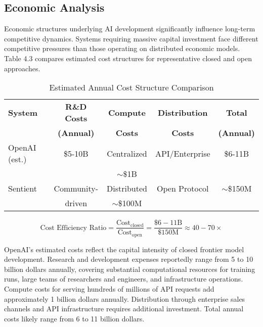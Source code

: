 \subsection{Economic Analysis}

Economic structures underlying AI development significantly influence long-term competitive dynamics. Systems requiring massive capital investment face different competitive pressures than those operating on distributed economic models. Table 4.3 compares estimated cost structures for representative closed and open approaches.

\begin{table}[h]
\centering
\caption{Estimated Annual Cost Structure Comparison}
\begin{tabular}{lcccc}
\toprule
\textbf{System} & \textbf{R\&D Costs} & \textbf{Compute} & \textbf{Distribution} & \textbf{Total} \\
                & \textbf{(Annual)}   & \textbf{Costs}   & \textbf{Costs}        & \textbf{(Annual)} \\
\midrule
OpenAI (est.)   & \$5-10B  & Centralized & API/Enterprise & \$6-11B \\
                &          & $\sim$\$1B  &                &         \\
Sentient        & Community- & Distributed & Open Protocol & $\sim$\$150M \\
                & driven   & $\sim$\$100M &               &         \\
\bottomrule
\end{tabular}
\label{tab:cost_comparison}
\end{table}

\begin{equation}
\text{Cost Efficiency Ratio} = \frac{\text{Cost}_{\text{closed}}}{\text{Cost}_{\text{open}}} = \frac{\$6{-}11\text{B}}{\$150\text{M}} \approx 40{-}70\times
\label{eq:cost_efficiency}
\end{equation}

OpenAI's estimated costs reflect the capital intensity of closed frontier model development. Research and development expenses reportedly range from 5 to 10 billion dollars annually, covering substantial computational resources for training runs, large teams of researchers and engineers, and infrastructure operations. Compute costs for serving hundreds of millions of API requests add approximately 1 billion dollars annually. Distribution through enterprise sales channels and API infrastructure requires additional investment. Total annual costs likely range from 6 to 11 billion dollars.

